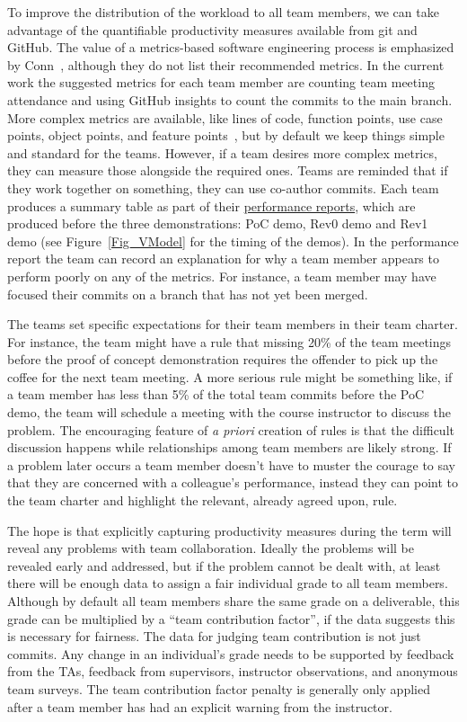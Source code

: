 \documentclass[10pt, conference]{IEEEtran}
\begin{document}
To improve the distribution of the workload to all team members, we can take
advantage of the quantifiable productivity measures available from git and
GitHub.  The value of a metrics-based software engineering process is emphasized
by Conn~\cite{connReusableAcademicstrengthMetricsbased2004}, although they do
not list their recommended metrics.  In the current work the suggested metrics
for each team member are counting team meeting attendance and using GitHub
insights to count the commits to the main branch.  More complex metrics are
available, like lines of code, function points, use case points, object points,
and feature points~\cite{sudhakarMeasuringProductivitySoftware2012}, but by
default we keep things simple and standard for the teams.  However, if a team
desires more complex metrics, they can measure those alongside the required
ones. Teams are reminded that if they work together on something, they can use
co-author commits. Each team produces a summary table as part of their
\href{REDACT LINK}  
{performance reports}, which are produced before the three demonstrations: PoC
demo, Rev0 demo and Rev1 demo (see Figure~\ref{Fig_VModel} for the timing of the
demos). In the performance report the team can record an explanation for why a
team member appears to perform poorly on any of the metrics. For instance, a
team member may have focused their commits on a branch that has not yet been
merged.

The teams set specific expectations for their team members in their team
charter. For instance, the team might have a rule that missing 20\% of the team
meetings before the proof of concept demonstration requires the offender to pick
up the coffee for the next team meeting. A more serious rule might be something
like, if a team member has less than 5\% of the total team commits before the
PoC demo, the team will schedule a meeting with the course instructor to discuss
the problem. The encouraging feature of \emph{a priori} creation of rules is
that the difficult discussion happens while relationships among team members are
likely strong.  If a problem later occurs a team member doesn't have to muster
the courage to say that they are concerned with a colleague's performance,
instead they can point to the team charter and highlight the relevant, already
agreed upon, rule.

The hope is that explicitly capturing productivity measures during the term will
reveal any problems with team collaboration.  Ideally the problems will be
revealed early and addressed, but if the problem cannot be dealt with, at least
there will be enough data to assign a fair individual grade to all team members.
Although by default all team members share the same grade on a deliverable, this
grade can be multiplied by a ``team contribution factor'', if the data suggests
this is necessary for fairness.  The data for judging team contribution is not
just commits.  Any change in an individual's grade needs to be supported by
feedback from the TAs, feedback from supervisors, instructor observations, and
anonymous team surveys.  The team contribution factor penalty is generally only
applied after a team member has had an explicit warning from the instructor.
\end{document}

